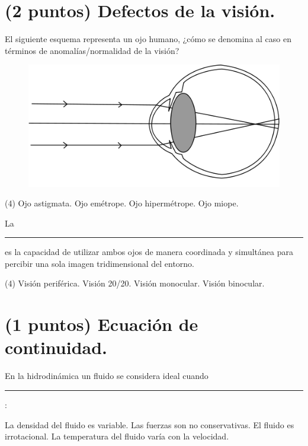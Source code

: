 \documentclass[12pt, letter]{exam}
\begin{document}
\begin{questions}
    \section{(2 puntos) Defectos de la visión.}
    
    \question El siguiente esquema representa un ojo humano, ¿cómo se denomina al caso en términos de anomalías/normalidad de la visión?
    \begin{figure}[H]
        \centering
        \includegraphics[scale=0.3]{Imagenes/Defectos_Vision_03.png}
    \end{figure}
    \begin{tasks}(4)
        \task Ojo astigmata.
        \task Ojo emétrope.
        \task Ojo hipermétrope.
        \task Ojo miope.
    \end{tasks}
    \question  La \rule{2cm}{0.1mm} es la capacidad de utilizar ambos ojos de manera coordinada y simultánea para percibir una sola imagen tridimensional del entorno.
    \begin{tasks}(4)
        \task Visión periférica.
        \task Visión 20/20.
        \task Visión monocular.
        \task Visión binocular.
    \end{tasks}

    \section{(1 puntos) Ecuación de continuidad.}

    \question En la hidrodinámica un fluido se considera ideal cuando \rule{2cm}{0.1mm}:
    \begin{tasks}
        \task La densidad del fluido es variable.
        \task Las fuerzas son no conservativas.
        \task El fluido es irrotacional.
        \task La temperatura del fluido varía con la velocidad.
    \end{tasks}


\end{questions}
\end{document}
